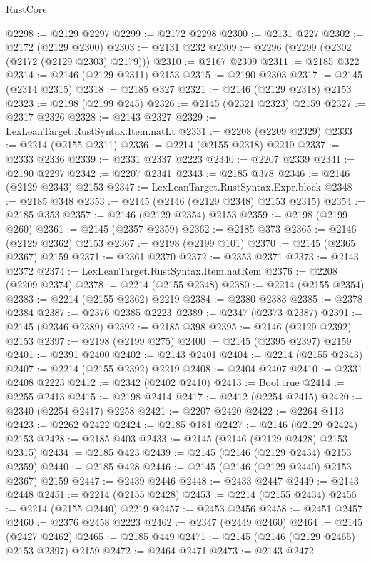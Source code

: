 \begin{lexlean}{RustCore}
\begin{coremodule}
@2298 := @2129 @2297
@2299 := @2172 @2298
@2300 := @2131 @227
@2302 := @2172 (@2129 @2300)
@2303 := @2131 @232
@2309 := @2296 (@2299 (@2302 (@2172 (@2129 @2303) @2179)))
@2310 := @2167 @2309
@2311 := @2185 @322
@2314 := @2146 (@2129 @2311) @2153
@2315 := @2190 @2303
@2317 := @2145 (@2314 @2315)
@2318 := @2185 @327
@2321 := @2146 (@2129 @2318) @2153
@2323 := @2198 (@2199 @245)
@2326 := @2145 (@2321 @2323) @2159
@2327 := @2317 @2326
@2328 := @2143 @2327
@2329 := LexLeanTarget.RustSyntax.Item.natLt
@2331 := @2208 (@2209 @2329)
@2333 := @2214 (@2155 @2311)
@2336 := @2214 (@2155 @2318) @2219
@2337 := @2333 @2336
@2339 := @2331 @2337 @2223
@2340 := @2207 @2339
@2341 := @2190 @2297
@2342 := @2207 @2341
@2343 := @2185 @378
@2346 := @2146 (@2129 @2343) @2153
@2347 := LexLeanTarget.RustSyntax.Expr.block
@2348 := @2185 @348
@2353 := @2145 (@2146 (@2129 @2348) @2153 @2315)
@2354 := @2185 @353
@2357 := @2146 (@2129 @2354) @2153
@2359 := @2198 (@2199 @260)
@2361 := @2145 (@2357 @2359)
@2362 := @2185 @373
@2365 := @2146 (@2129 @2362) @2153
@2367 := @2198 (@2199 @101)
@2370 := @2145 (@2365 @2367) @2159
@2371 := @2361 @2370
@2372 := @2353 @2371
@2373 := @2143 @2372
@2374 := LexLeanTarget.RustSyntax.Item.natRem
@2376 := @2208 (@2209 @2374)
@2378 := @2214 (@2155 @2348)
@2380 := @2214 (@2155 @2354)
@2383 := @2214 (@2155 @2362) @2219
@2384 := @2380 @2383
@2385 := @2378 @2384
@2387 := @2376 @2385 @2223
@2389 := @2347 (@2373 @2387)
@2391 := @2145 (@2346 @2389)
@2392 := @2185 @398
@2395 := @2146 (@2129 @2392) @2153
@2397 := @2198 (@2199 @275)
@2400 := @2145 (@2395 @2397) @2159
@2401 := @2391 @2400
@2402 := @2143 @2401
@2404 := @2214 (@2155 @2343)
@2407 := @2214 (@2155 @2392) @2219
@2408 := @2404 @2407
@2410 := @2331 @2408 @2223
@2412 := @2342 (@2402 @2410)
@2413 := Bool.true
@2414 := @2255 @2413
@2415 := @2198 @2414
@2417 := @2412 (@2254 @2415)
@2420 := @2340 (@2254 @2417) @2258
@2421 := @2207 @2420
@2422 := @2264 @113
@2423 := @2262 @2422
@2424 := @2185 @181
@2427 := @2146 (@2129 @2424) @2153
@2428 := @2185 @403
@2433 := @2145 (@2146 (@2129 @2428) @2153 @2315)
@2434 := @2185 @423
@2439 := @2145 (@2146 (@2129 @2434) @2153 @2359)
@2440 := @2185 @428
@2446 := @2145 (@2146 (@2129 @2440) @2153 @2367) @2159
@2447 := @2439 @2446
@2448 := @2433 @2447
@2449 := @2143 @2448
@2451 := @2214 (@2155 @2428)
@2453 := @2214 (@2155 @2434)
@2456 := @2214 (@2155 @2440) @2219
@2457 := @2453 @2456
@2458 := @2451 @2457
@2460 := @2376 @2458 @2223
@2462 := @2347 (@2449 @2460)
@2464 := @2145 (@2427 @2462)
@2465 := @2185 @449
@2471 := @2145 (@2146 (@2129 @2465) @2153 @2397) @2159
@2472 := @2464 @2471
@2473 := @2143 @2472

\end{coremodule}
\end{lexlean}
